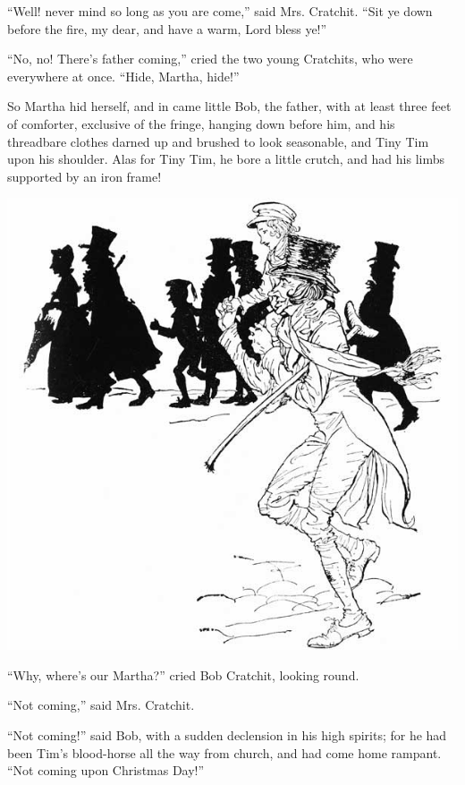 \documentclass[paper=5.5in:8.5in,BCOR=15mm,twoside,DIV=15,headinclude=off,12pt,chapterprefix=off,openany,headings=huge]{scrbook} %
\begin{document}
\enquote{Well! never mind so long as you are come,} said Mrs. Cratchit. \enquote{Sit ye down before the fire, my dear, and have a warm, Lord bless ye!}

\enquote{No, no! There's father coming,} cried the two young Cratchits, who were everywhere at once. \enquote{Hide, Martha, hide!}

So Martha hid herself, and in came little Bob, the father, with at least three feet of comforter, exclusive of the fringe, hanging down before him, and his threadbare clothes darned up and brushed to look seasonable, and Tiny Tim upon his shoulder. Alas for Tiny Tim, he bore a little crutch, and had his limbs supported by an iron frame!

 \begin{center}
     \vfill%
     \includegraphics[width=\columnwidth]{gs109b}
 \end{center}
\clearpage


\enquote{Why, where's our Martha?} cried Bob Cratchit, looking round.

\enquote{Not coming,} said Mrs. Cratchit.


\enquote{Not coming!} said Bob, with a sudden declension in his high spirits; for he had been Tim's blood-horse all the way from church, and had come home rampant. \enquote{Not coming upon Christmas Day!}
\end{document}
